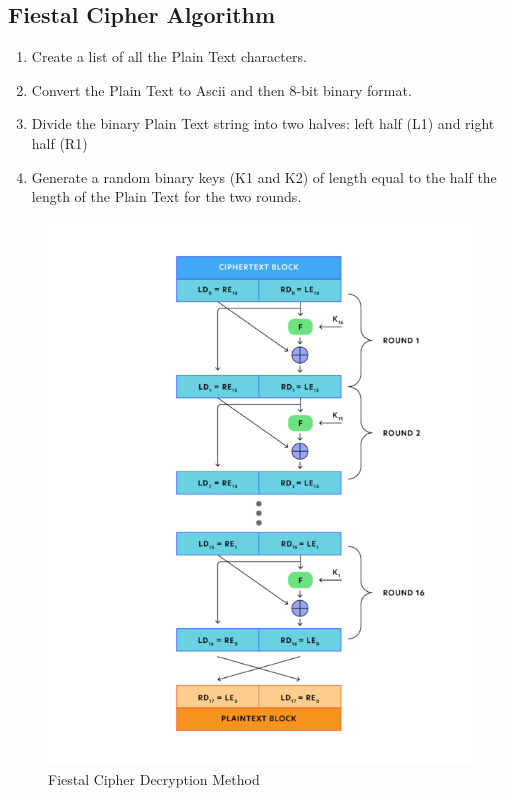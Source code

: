 \documentclass[11pt]{article}
\begin{document}
\subsection{Fiestal Cipher Algorithm}

\begin{enumerate}
	\item Create a list of all the Plain Text characters.

	\item Convert the Plain Text to Ascii and then 8-bit binary format.

	\item Divide the binary Plain Text string into two halves: left half (L1) and right half (R1)

	\item Generate a random binary keys (K1 and K2) of length equal to the half the length of the Plain Text for the two rounds.

\end{enumerate}

\begin{figure}[H]
	\centering
	\includegraphics[scale=0.5]{fiestal_cipher.png}
	\caption{Fiestal Cipher Decryption Method}
\end{figure}
\end{document}
